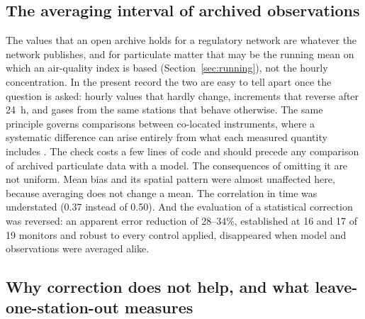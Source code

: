 \subsection{The averaging interval of archived observations}

The values that an open archive holds for a regulatory network are whatever the network
publishes, and for particulate matter that may be the running mean on which an air-quality index
is based (Section~\ref{sec:running}), not the hourly concentration. In the present record the two are easy
to tell apart once the question is asked: hourly values that hardly change, increments that
reverse after 24~h, and gases from the same stations that behave otherwise. The same principle governs comparisons
between co-located instruments, where a systematic difference can arise entirely from what each
measured quantity includes \citep{you2026nai}. The check costs a
few lines of code and should precede any comparison of archived particulate data with a model.
The consequences of omitting it are not uniform. Mean bias and its spatial pattern were almost
unaffected here, because averaging does not change a mean. The correlation in time was
understated (0.37 instead of 0.50). And the evaluation of a statistical correction was
reversed: an apparent error reduction of 28--34\%, established at 16 and 17 of 19 monitors and
robust to every control applied, disappeared when model and observations were averaged alike.

\subsection{Why correction does not help, and what leave-one-station-out measures}

